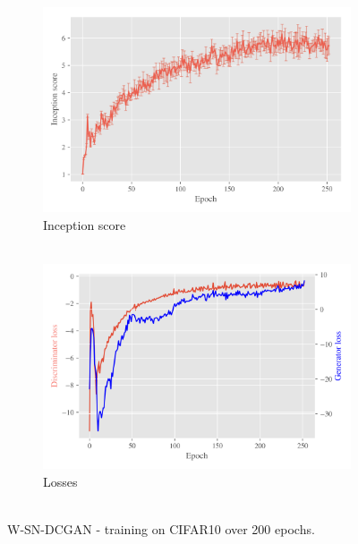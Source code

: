 \begin{figure}[H]
    \centering
    \begin{subfigure}[t]{0.49\textwidth}
        \centering
		\includegraphics[width=\textwidth]{../code/results/figures/w-sn-dcgan_cifar10_is.png}
		\caption{Inception score\\~}
		\label{fig:exp-w-sn-dcgan-is}
    \end{subfigure}
    \begin{subfigure}[t]{0.49\textwidth}
        \centering
        \includegraphics[width=\textwidth]{../code/results/figures/w-sn-dcgan_cifar10_losses.png}
		\caption{Losses\\~}
		\label{fig:exp-w-sn-dcgan-losses}
    \end{subfigure}
    \caption{W-SN-DCGAN - training on CIFAR10 over 200 epochs.}
\end{figure}

